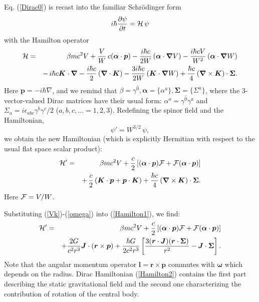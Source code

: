 \documentclass[preprint,showpacs,preprintnumbers,amsmath,amssymb]{revtex4}
\begin{document}
Eq. (\ref{Dirac0}) is recast into the familiar Schr\"odinger form
\begin{equation}\label{Dirac1}
i\hbar{\frac {\partial\psi} {\partial t}} = %
{\cal H}\,\psi
\end{equation}
with the Hamilton operator
\begin{eqnarray}
{\cal H} &=& \beta mc^2V + {\frac V W}\,c(\bm{\alpha} \cdot\bm{p})
- {\frac {i\hbar c}{2W}}\left(\bm{\alpha}\cdot \bm{\nabla}V\right)
- {\frac {i\hbar cV}{W^2}}\left(\bm{\alpha}
\cdot\bm{\nabla}W\right)\nonumber\\
&& -\,i\hbar c \bm{K}\cdot\bm{\nabla} - {\frac {i\hbar c}
2}\,(\bm{\nabla} \cdot\bm{K}) - {\frac {3i\hbar c}
{2W}}\,(\bm{K}\cdot\bm{\nabla}W) + {\frac {\hbar
c}4}\,(\bm{\nabla}\times\bm{K})\cdot\bm{\Sigma}.\label{Hamilton0}
\end{eqnarray}
Here $\bm p=-i\hbar\nabla$, and we remind that $\beta = \gamma^{\hat 0},
{\bm\alpha} = \{\alpha^a\}, {\bm\Sigma} = \{\Sigma^a\}$, where the
3-vector-valued Dirac matrices have their usual form: $\alpha^a
= \gamma^{\hat 0}\gamma^a$ and $\Sigma_a = i\epsilon_{abc}\gamma^b
\gamma^c/2$ ($a,b,c,\dots = 1,2,3$). Redefining the spinor field and the
Hamiltonian,
\begin{equation}
\psi' = W^{3/2}\,\psi, %
\end{equation}
we obtain the new Hamiltonian (which is explicitly Hermitian with
respect to the usual flat space scalar product):
\begin{eqnarray}
{\cal H}' &=& \beta mc^2V + {\frac c 2}\left[(\bm{\alpha}
\cdot\bm{p}){\cal F} + {\cal F}(\bm{\alpha}\cdot\bm{p})\right]\nonumber\\
&& +\,{\frac c2}\left(\bm{K}\cdot\bm{p} + \bm{p}\cdot\bm{K}\right)
+ {\frac {\hbar
c}4}\,(\bm{\nabla}\times\bm{K})\cdot\bm{\Sigma}.\label{Hamilton1}
\end{eqnarray}
Here ${\cal F} = V/W$.

Substituting (\ref{Vk})-(\ref{omega}) into (\ref{Hamilton1}), we
find:
\begin{eqnarray}
{\cal H}' &=& \beta mc^2V + {\frac c 2}\left[(\bm{\alpha}\cdot\bm{p})
{\cal F} + {\cal F}(\bm{\alpha}\cdot\bm{p})\right]\nonumber\\
&& +\frac{2G}{c^2r^3}\bm{J}\cdot\left(\bm{r}\times\bm{p}\right)
+ \frac{\hbar G}{2c^2r^3}\left[ {\frac {3(\bm{r}\cdot\bm{J})(\bm{r}
\cdot\bm{\Sigma})}{r^2}} -\bm{J}\cdot\bm{\Sigma}\right].\label{Hamilton2}
\end{eqnarray}
Note that the angular momentum operator $\bm{l}=\bm{r}\times\bm{p}$
commutes with $\bm{\omega}$ which depends on the radius. Dirac
Hamiltonian (\ref{Hamilton2}) contains the first part describing the
static gravitational field and the second one characterizing the
contribution of rotation of the central body.
\end{document}
